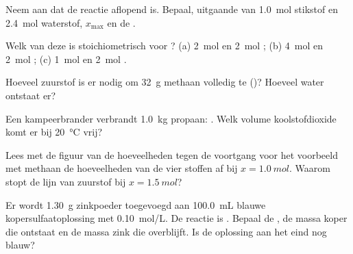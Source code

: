 \begin{exercise}[$\star$]\label{exo:g10:reaction-progress-table:4}
Neem aan dat de reactie  aflopend is. Bepaal,
uitgaande van \qty{1.0}{mol} stikstof en \qty{2.4}{mol} waterstof,
$x_{\max}$ en de .
\end{exercise}

\begin{exercise}[$\star$]\label{exo:g10:reaction-progress-table:5}
Welk van deze  is stoichiometrisch voor ?
(a) \qty{2}{mol}  en \qty{2}{mol} ; (b) \qty{4}{mol}
 en \qty{2}{mol} ; (c) \qty{1}{mol}  en
\qty{2}{mol} .
\end{exercise}

\begin{exercise}[$\star\star$]\label{exo:g10:reaction-progress-table:6}
Hoeveel zuurstof is er nodig om \qty{32}{g} methaan volledig te
 ()? Hoeveel water ontstaat er?
\end{exercise}

\begin{exercise}[$\star\star$]\label{exo:g10:reaction-progress-table:7}
Een kampeerbrander verbrandt \qty{1.0}{kg} propaan:
. Welk volume koolstofdioxide komt er bij
\qty{20}{\celsius} vrij?
\end{exercise}

\begin{exercise}[$\star\star$]\label{exo:g10:reaction-progress-table:8}
Lees met de figuur van de hoeveelheden tegen de voortgang voor het
voorbeeld met methaan de hoeveelheden van de vier stoffen af bij
$x = \qty{1.0}{mol}$. Waarom stopt de lijn van zuurstof bij
$x = \qty{1.5}{mol}$?
\end{exercise}

\begin{exercise}[$\star\star$]\label{exo:g10:reaction-progress-table:9}
Er wordt \qty{1.30}{g} zinkpoeder toegevoegd aan \qty{100.0}{mL} blauwe
kopersulfaatoplossing met \qty{0.10}{mol/L}. De reactie is
.
Bepaal de , de massa koper die ontstaat en de massa
zink die overblijft. Is de oplossing aan het eind nog blauw?
\end{exercise}

